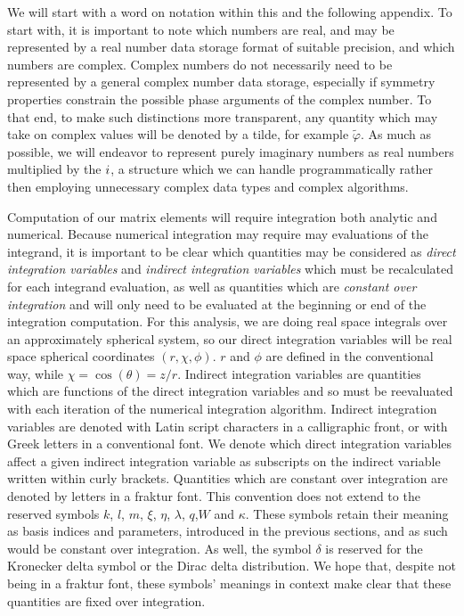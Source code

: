 We will start with a word on notation within this and the following appendix. To
start with, it is important to note which numbers are real, and may be
represented by a real number data storage format of suitable precision, and
which numbers are complex. Complex numbers do not necessarily need to be
represented by a general complex number data storage, especially if symmetry
properties constrain the possible phase arguments of the complex number. To that
end, to make such distinctions more transparent, any quantity which may take on
complex values will be denoted by a tilde, for example $\tilde{\varphi}$. As
much as possible, we will endeavor to represent purely imaginary numbers as real
numbers multiplied by the $i$, a structure which we can handle
programmatically rather then employing unnecessary complex data types and
complex algorithms.

Computation of our matrix elements will require integration both analytic and
numerical. Because numerical integration may require may evaluations of the
integrand, it is important to be clear which quantities may be considered as
\emph{direct integration variables} and \emph{indirect integration variables}
which must be recalculated for each integrand evaluation, as well as quantities
which are \emph{constant over integration} and will only need to be evaluated at
the beginning or end of the integration computation. For this analysis, we are
doing real space integrals over an approximately spherical system, so our direct
integration variables will be real space spherical coordinates
$\left(r,\chi,\phi\right)$. $r$ and $\phi$ are defined in the conventional way,
while $\chi = \cos\left(\theta\right) = z/r$. Indirect integration variables are
quantities which are functions of the direct integration variables and so must
be reevaluated with each iteration of the numerical integration algorithm.
Indirect integration variables are denoted with Latin script characters in a
calligraphic front, or with Greek letters in a conventional font. We denote
which direct integration variables affect a given indirect integration variable
as subscripts on the indirect variable written within curly brackets. Quantities
which are constant over integration are denoted by letters in a fraktur font.
This convention does not extend to the reserved symbols $k$, $l$, $m$, $\xi$,
$\eta$, $\lambda$, $q$,$W$ and $\kappa$. These symbols retain their meaning as
basis indices and parameters, introduced in the previous sections, and as such
would be constant over integration. As well, the symbol $\delta$ is reserved for
the Kronecker delta symbol or the Dirac delta distribution. We hope that,
despite not being in a fraktur font, these symbols' meanings in context make
clear that these quantities are fixed over integration.

